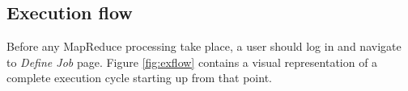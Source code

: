 \documentclass{sig-alternate}
\begin{document}
%  
%  
%  
% 
% 
%    
%  
% 




\subsection{Execution flow}\label{subsec:execution}
\noindent Before any MapReduce processing take place, a user should log in and navigate to \emph{Define Job} page. Figure \ref{fig:exflow} contains a visual representation of a complete execution cycle starting up from that point.
\end{document}
